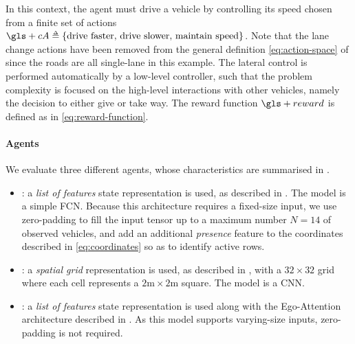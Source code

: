 In this context, the agent must drive a vehicle by controlling its speed chosen from a finite set of actions $\gls+{cA} \eqdef \{\text{drive faster},\, \text{drive slower},\, \text{maintain speed}\}$. Note that the lane change actions have been removed from the general definition \eqref{eq:action-space} of  since the roads are all single-lane in this example. The lateral control is performed automatically by a low-level controller, such that the problem complexity is focused on the high-level interactions with other vehicles, namely the decision to either give or take way. The reward function $\gls+{reward}$ is defined as in \eqref{eq:reward-function}.

\paragraph{Agents}

We evaluate three different agents, whose characteristics are summarised in .
\begin{itemize}
	\item \MLPL: a \emph{list of features} state representation is used, as described in . The model is a simple \gls{FCN}. Because this architecture requires a fixed-size input, we use zero-padding to fill the input tensor up to a maximum number $N=14$ of observed vehicles, and add an additional \emph{presence} feature to the coordinates described in \eqref{eq:coordinates} so as to identify active rows.
	\item \CNNG: a \emph{spatial grid} representation is used, as described in , with a $32 \times 32$ grid where each cell represents a $2\text{m}\times 2$m square. The model is a \gls{CNN}.
	\item \EgoAtt: a \emph{list of features} state representation is used along with the Ego-Attention architecture described in . As this model supports varying-size inputs, zero-padding is not required.
\end{itemize}

